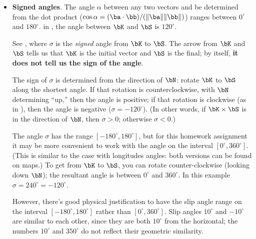 \documentclass[11pt,titlepage,fleqn]{article}
\begin{document}
\begin{spacing}{1.0}
\begin{itemize}
\item {\bf Signed angles}.
The angle $\alpha$ between any two vectors and be determined from the dot product ($\cos\alpha = (\ba \cdot \bb) / (\|\ba\|\|\bb\|)$) ranges between $0^\circ$ and $180^\circ$. in , the angle between $\bK$ and $\bS$ is $120^\circ$.

See , where $\sigma$ is the {\em signed} angle from $\bK$ to $\bS$. The arrow from $\bK$ and $\bS$ tells us that $\bK$ is the initial vector and $\bS$ is the final; by itself, {\bf it does not tell us the sign of the angle}.

The sign of $\sigma$ is determined from the direction of $\bN$: rotate $\bK$ to $\bS$ along the shortest angle. If that rotation is counterclockwise, with $\bN$ determining ``up,'' then the angle is positive; if that rotation is clockwise (as in ), then the angle is negative ($\sigma = -120^\circ$). (In other words, if $\bK \times \bS$ is in the direction of $\bN$, then $\sigma > 0$; otherwise $\sigma < 0$.)

The angle $\sigma$ has the range $[-180^\circ, 180^\circ]$, but for this homework assignment it may be more convenient to work with the angle on the interval $[0^\circ, 360^\circ]$. (This is similar to the case with longitudes angles: both versions can be found on maps.) To get from $\bK$ to $\bS$, you can rotate counter-clockwise (looking down $\bN$); the resultant angle is between $0^\circ$ and $360^\circ$. In this example $\sigma = 240^\circ = -120^\circ$.

However, there's good physical justification to have the slip angle range on the interval $[-180^\circ, 180^\circ]$ rather than $[0^\circ, 360^\circ]$. Slip angles $10^\circ$ and $-10^\circ$ are similar to each other, since they are both $10^\circ$ from the horizontal; the numbers $10^\circ$ and $350^\circ$ do not reflect their geometric similarity.



\end{itemize}
\end{spacing}
\end{document}
